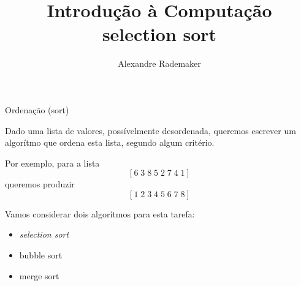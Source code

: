 \documentclass{beamer}
\title{Introdução à Computação \\ selection sort}
\author{Alexandre Rademaker}
\date{}
\begin{document}
\begin{frame}
 \maketitle
\end{frame}


\begin{frame}{Ordenação (sort)}

  Dado uma lista de valores, possívelmente desordenada, queremos
  escrever um algorítmo que ordena esta lista, segundo algum critério.

  Por exemplo, para a lista
  \[
    [ 6 \; 3 \; 8 \; 5 \; 2 \; 7 \; 4 \; 1 ]
  \]
  queremos produzir
  \[
    [ 1 \; 2 \; 3 \; 4 \; 5 \; 6 \; 7 \; 8 ]
  \]

  \framebreak

  Vamos considerar dois algorítmos para esta tarefa:

  \begin{itemize}
  \item \emph{selection sort}
  \item bubble sort
  \item merge sort
  \end{itemize}

\end{frame}
\end{document}
